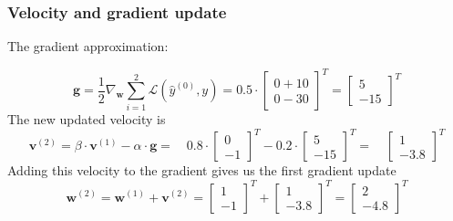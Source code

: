 \documentclass[addpoints]{exam}
\begin{document}
\subsubsection{Velocity and gradient update}
The gradient approximation:

\begin{equation}
	\textbf{g} = \frac{1}{2} \nabla_{\textbf{w}}{\sum_{i = 1}^{2}\mathscr{L}(\hat{{y}}^{(0)},y)} = 0.5 \cdot\begin{bmatrix}
		0 +10 \\0-30
		
	\end{bmatrix}^{T} = \begin{bmatrix}
		5 \\-15
		
	\end{bmatrix}^{T}
\end{equation}
The new updated velocity is 
\begin{equation}
	\textbf{v}^{(2)} = \beta \cdot \textbf{v}^{(1)} - \alpha \cdot \textbf{g} = \quad  0.8\cdot \begin{bmatrix}
		0 \\-1
		
	\end{bmatrix}^{T}- 0.2 \cdot \begin{bmatrix}
		5 \\-15
		
	\end{bmatrix}^{T} = \quad  \begin{bmatrix}
		1 \\-3.8
		
	\end{bmatrix}^{T}
\end{equation}
Adding this velocity to the gradient gives us the first gradient update
\begin{equation}
	\textbf{w}^{(2)} = \textbf{w}^{(1)} + \textbf{v}^{(2)} = \begin{bmatrix}
		1 \\-1
		
	\end{bmatrix}^{T} +  \begin{bmatrix}
		1 \\-3.8
		
	\end{bmatrix}^{T} =  \begin{bmatrix}
		2 \\-4.8
		
	\end{bmatrix}^{T}
\end{equation}
\end{document}
